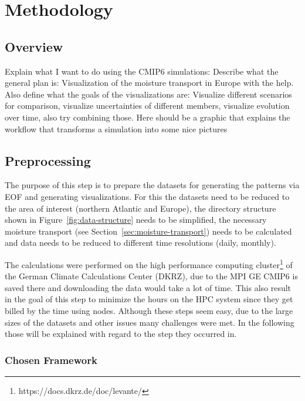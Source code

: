 \chapter{Methodology}
\label{ch:methodology}

\section{Overview}

Explain what I want to do using the CMIP6 simulations: Describe what the general plan is: Visualization of the moisture transport in Europe with the help. 
Also define what the goals of the visualizations are: Visualize different scenarios for comparison, visualize uncertainties of different members, visualize evolution over time, also try combining those. 
Here should be a graphic that explains the workflow that transforms a simulation into some nice pictures


\section{Preprocessing}
\label{sec:preprocessing}

The purpose of this step is to prepare the datasets for generating the patterns via EOF and generating visualizations. For this the datasets need to be reduced to the area of interest (northern Atlantic and Europe), the directory structure shown in Figure~\ref{fig:data-structure} needs to be simplified, the necessary moisture transport (see Section~\ref{sec:moisture-transport}) needs to be calculated and data needs to be reduced to different time resolutions (daily, monthly). 

The calculations were performed on the high performance computing cluster\footnote{https://docs.dkrz.de/doc/levante/} of the German Climate Calculations Center (DKRZ), due to the MPI GE CMIP6 is saved there and downloading the data would take a lot of time. 
This also result in the goal of this step to minimize the hours on the HPC system since they get billed by the time using nodes. 
Although these steps seem easy, due to the large sizes of the datasets and other issues many challenges were met. 
In the following those will be explained with regard to the step they occurred in. 



\subsection{Chosen Framework}
\label{sec:preprocessing_framework}

